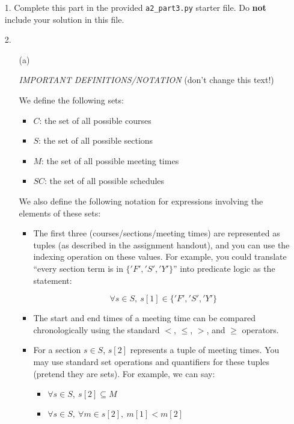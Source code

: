 \documentclass[fontsize=11pt]{article}
\begin{document}
\begin{enumerate}

\item[1.]
Complete this part in the provided \texttt{a2\_part3.py} starter file.
Do \textbf{not} include your solution in this file.

\item[2.]

\begin{enumerate}
\item[(a)]

\emph{IMPORTANT DEFINITIONS/NOTATION} (don't change this text!)

We define the following sets:

\begin{itemize}
\item $C$: the set of all possible courses
\item $S$: the set of all possible sections
\item $M$: the set of all possible meeting times
\item $SC$: the set of all possible schedules
\end{itemize}

We also define the following notation for expressions involving the elements of these sets:

\begin{itemize}
\item
The first three (courses/sections/meeting times) are represented as tuples (as described in the assignment handout), and you can use the indexing operation on these values. For example, you could translate ``every section term is in $\{'F', 'S', 'Y'\}$'' into predicate logic as the statement:

    \[\forall s \in S,~ s[1] \in \{'F', 'S', 'Y' \} \]

\item
The start and end times of a meeting time can be compared chronologically using the standard $<$, $\leq$, $>$, and $\geq$ operators.

\item
For a section $s \in S$, $s[2]$ represents a tuple of meeting times.
You may use standard set operations and quantifiers for these tuples (pretend they are sets).
For example, we can say:

    \begin{itemize}
    \item $\forall s \in S,~ s[2] \subseteq M$
    \item $\forall s \in S,~ \forall m \in s[2],~ m[1] < m[2]$
    \end{itemize}


\end{itemize}
\end{enumerate}
\end{enumerate}
\end{document}
